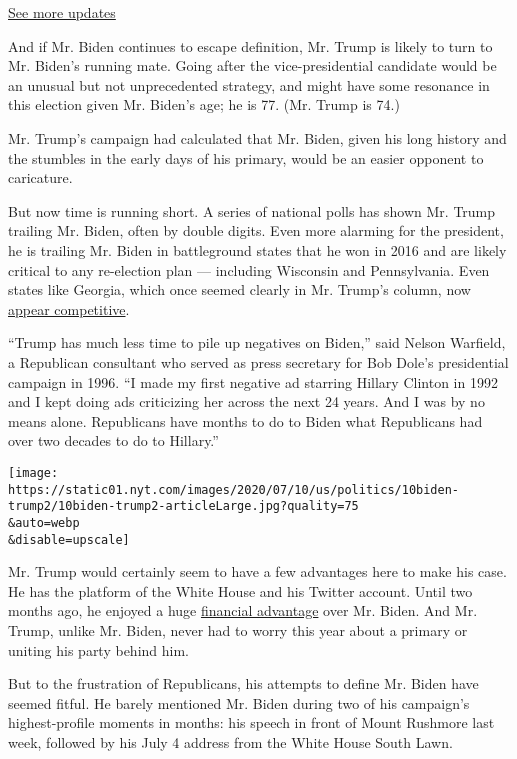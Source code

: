\href{https://www.nytimes.com/2020/08/04/us/elections/primary-election-michigan-arizona-kansas.html?action=click\&pgtype=Article\&state=default\&region=MAIN_CONTENT_1\&context=storylines_live_updates}{See
more updates}

And if Mr. Biden continues to escape definition, Mr. Trump is likely to
turn to Mr. Biden's running mate. Going after the vice-presidential
candidate would be an unusual but not unprecedented strategy, and might
have some resonance in this election given Mr. Biden's age; he is 77.
(Mr. Trump is 74.)

Mr. Trump's campaign had calculated that Mr. Biden, given his long
history and the stumbles in the early days of his primary, would be an
easier opponent to caricature.

But now time is running short. A series of national polls has shown Mr.
Trump trailing Mr. Biden, often by double digits. Even more alarming for
the president, he is trailing Mr. Biden in battleground states that he
won in 2016 and are likely critical to any re-election plan ---
including Wisconsin and Pennsylvania. Even states like Georgia, which
once seemed clearly in Mr. Trump's column, now
\href{https://cookpolitical.com/analysis/national/national-politics/new-july-2020-electoral-college-ratings}{appear
competitive}.

``Trump has much less time to pile up negatives on Biden,'' said Nelson
Warfield, a Republican consultant who served as press secretary for Bob
Dole's presidential campaign in 1996. ``I made my first negative ad
starring Hillary Clinton in 1992 and I kept doing ads criticizing her
across the next 24 years. And I was by no means alone. Republicans have
months to do to Biden what Republicans had over two decades to do to
Hillary.''

\texttt{[image: https://static01.nyt.com/images/2020/07/10/us/politics/10biden-trump2/10biden-trump2-articleLarge.jpg?quality=75\\\&auto=webp\\\&disable=upscale]}

Mr. Trump would certainly seem to have a few advantages here to make his
case. He has the platform of the White House and his Twitter account.
Until two months ago, he enjoyed a huge
\href{https://www.nytimes.com/2020/07/01/us/politics/trump-fundraising-2020.html}{financial
advantage} over Mr. Biden. And Mr. Trump, unlike Mr. Biden, never had to
worry this year about a primary or uniting his party behind him.

But to the frustration of Republicans, his attempts to define Mr. Biden
have seemed fitful. He barely mentioned Mr. Biden during two of his
campaign's highest-profile moments in months: his speech in front of
Mount Rushmore last week, followed by his July 4 address from the White
House South Lawn.


